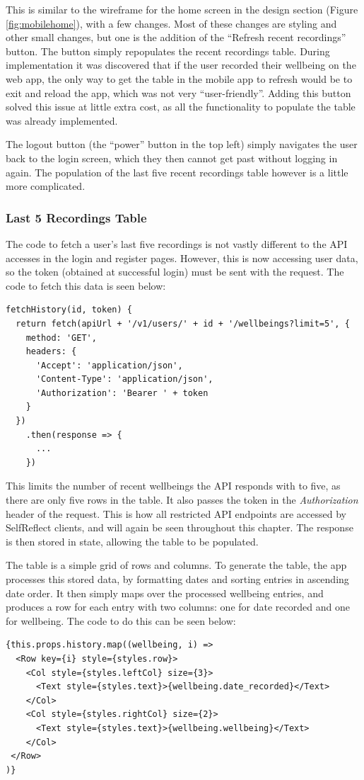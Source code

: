 \documentclass[11pt,openright,a4paper]{report}
\begin{document}
This is similar to the wireframe for the home screen in the design section (Figure \ref{fig:mobilehome}), with a few changes. Most of these changes are styling and other small changes, but one is the addition of the \enquote{Refresh recent recordings} button. The button simply repopulates the recent recordings table. During implementation it was discovered that if the user recorded their wellbeing on the web app, the only way to get the table in the mobile app to refresh would be to exit and reload the app, which was not very \enquote{user-friendly}. Adding this button solved this issue at little extra cost, as all the functionality to populate the table was already implemented.

The logout button (the \enquote{power} button in the top left) simply navigates the user back to the login screen, which they then cannot get past without logging in again. The population of the last five recent recordings table however is a little more complicated.

\subsubsection{Last 5 Recordings Table}
The code to fetch a user's last five recordings is not vastly different to the API accesses in the login and register pages. However, this is now accessing user data, so the token (obtained at successful login) must be sent with the request. The code to fetch this data is seen below:

\begin{lstlisting}
fetchHistory(id, token) {
  return fetch(apiUrl + '/v1/users/' + id + '/wellbeings?limit=5', {
    method: 'GET',
    headers: {
      'Accept': 'application/json',
      'Content-Type': 'application/json',
      'Authorization': 'Bearer ' + token
    }
  })
    .then(response => {
      ...
    })
\end{lstlisting}

This limits the number of recent wellbeings the API responds with to five, as there are only five rows in the table. It also passes the token in the \emph{Authorization} header of the request. This is how all restricted API endpoints are accessed by SelfReflect clients, and will again be seen throughout this chapter. The response is then stored in state, allowing the table to be populated.

The table is a simple grid of rows and columns. To generate the table, the app processes this stored data, by formatting dates and sorting entries in ascending date order. It then simply maps over the processed wellbeing entries, and produces a row for each entry with two columns: one for date recorded and one for wellbeing. The code to do this can be seen below:
\begin{lstlisting}
{this.props.history.map((wellbeing, i) =>
  <Row key={i} style={styles.row}>
    <Col style={styles.leftCol} size={3}>
      <Text style={styles.text}>{wellbeing.date_recorded}</Text>
    </Col>
    <Col style={styles.rightCol} size={2}>
      <Text style={styles.text}>{wellbeing.wellbeing}</Text>
    </Col>
 </Row>
)}
\end{lstlisting}
\end{document}
